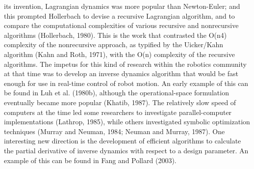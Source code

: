 its invention, Lagrangian dynamics was more popular than Newton-Euler; and this prompted Hollerbach to devise a recursive Lagrangian algorithm, and to compare the computational complexities of various recursive and nonrecursive algorithms (Hollerbach, 1980). This is the work that contrasted the O(n4) complexity of the nonrecursive approach, as typified by the Uicker/Kahn algorithm (Kahn and Roth, 1971), with the O(n) complexity of the recursive algorithms. The impetus for this kind of research within the robotics community at that time was to develop an inverse dynamics algorithm that would be fast enough for use in real-time control of robot motion. An early example of this can be found in Luh et al. (1980b), although the operational-space formulation eventually became more popular (Khatib, 1987). The relatively slow speed of computers at the time led some researchers to investigate parallel-computer implementations (Lathrop, 1985), while others investigated symbolic optimization techniques (Murray and Neuman, 1984; Neuman and Murray, 1987). One interesting new direction is the development of efficient algorithms to calculate the partial derivative of inverse dynamics with respect to a design parameter. An example of this can be found in Fang and Pollard (2003).
